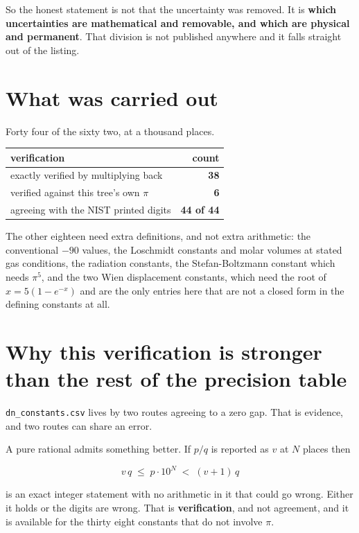 So the honest statement is not that the uncertainty was removed. It is \textbf{which uncertainties
are mathematical and removable, and which are physical and permanent}. That division is not
published anywhere and it falls straight out of the listing.

\section{What was carried out}

Forty four of the sixty two, at a thousand places.

\begin{center}
\begin{tabular}{lr}
\toprule
verification & count \\
\midrule
exactly verified by multiplying back & \textbf{38} \\
verified against this tree's own \(\pi\) & \textbf{6} \\
agreeing with the NIST printed digits & \textbf{44 of 44} \\
\bottomrule
\end{tabular}
\end{center}

The other eighteen need extra definitions, and not extra arithmetic: the conventional
\(-90\) values, the Loschmidt constants and molar volumes at stated gas conditions, the radiation
constants, the Stefan-Boltzmann constant which needs \(\pi^5\), and the two Wien displacement
constants, which need the root of \(x = 5(1 - e^{-x})\) and are the only entries here that are not a
closed form in the defining constants at all.

\section{Why this verification is stronger than the rest of the precision table}

\texttt{dn\_constants.csv} lives by two routes agreeing to a zero gap. That is evidence, and two
routes can share an error.

A pure rational admits something better. If \(p/q\) is reported as \(v\) at \(N\) places then

\[
  v\,q \;\le\; p \cdot 10^{N} \;<\; (v+1)\,q
\]

is an exact integer statement with no arithmetic in it that could go wrong. Either it holds or the
digits are wrong. That is \textbf{verification}, and not agreement, and it is available for the
thirty eight constants that do not involve \(\pi\).

